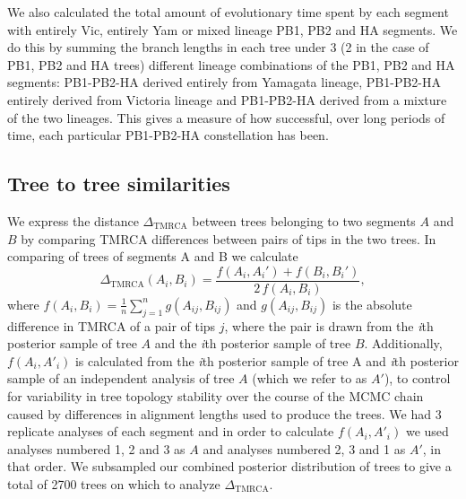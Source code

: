 \documentclass[11pt,oneside,letterpaper]{article}
\newcommand{\dtmrca}{\Delta_\mathrm{TMRCA}}
\begin{document}
We also calculated the total amount of evolutionary time spent by each segment with entirely Vic, entirely Yam or mixed lineage PB1, PB2 and HA segments.
We do this by summing the branch lengths in each tree under 3 (2 in the case of PB1, PB2 and HA trees) different lineage combinations of the PB1, PB2 and HA segments: PB1-PB2-HA derived entirely from Yamagata lineage, PB1-PB2-HA entirely derived from Victoria lineage and PB1-PB2-HA derived from a mixture of the two lineages.
This gives a measure of how successful, over long periods of time, each particular PB1-PB2-HA constellation has been.

\subsection*{Tree to tree similarities}

We express the distance $\dtmrca$ between trees belonging to two segments $A$ and $B$ by comparing TMRCA differences between pairs of tips in the two trees.
In comparing of trees of segments A and B we calculate
\begin{equation}
\dtmrca(A_i, B_i) = \frac{f(A_i, A_i') + f(B_i, B_i')}{2 \, f(A_i, B_i)},
\end{equation}
where $f(A_i, B_i) = \frac{1}{n}\sum_{j=1}^n g(A_{ij}, B_{ij})$ and $g(A_{ij},B_{ij})$ is the absolute difference in TMRCA of a pair of tips $j$, where the pair is drawn from the \textit{i}th posterior sample of tree $A$ and the \textit{i}th posterior sample of tree $B$.
Additionally, $f(A_i,A'_i)$ is calculated from the \textit{i}th posterior sample of tree A and \textit{i}th posterior sample of an independent analysis of tree $A$ (which we refer to as $A'$), to control for variability in tree topology stability over the course of the MCMC chain caused by differences in alignment lengths used to produce the trees.
We had 3 replicate analyses of each segment and in order to calculate $f(A_i,A'_i)$ we used analyses numbered 1, 2 and 3 as $A$ and analyses numbered 2, 3 and 1 as $A'$, in that order.
We subsampled our combined posterior distribution of trees to give a total of 2700 trees on which to analyze $\dtmrca$.
\end{document}
